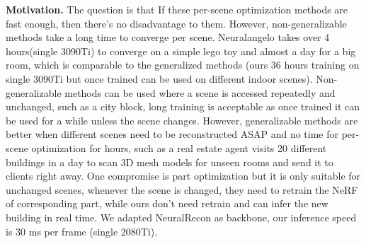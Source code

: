 \noindent
\textbf{Motivation.} The question is that If these per-scene optimization methods are fast enough, then there's no disadvantage to them. However, non-generalizable methods take a long time to converge per scene. Neuralangelo\cite{neuralangelo} takes over 4 hours(single 3090Ti) to converge on a simple lego toy and almost a day for a big room, which is comparable to the generalized methods (ours 36 hours training on single 3090Ti but once trained can be used on different indoor scenes). Non-generalizable methods can be used where a scene is accessed repeatedly and unchanged, such as a city block, long training is acceptable as once trained it can be used for a while unless the scene changes. However, generalizable methods are better when different scenes need to be reconstructed ASAP and no time for per-scene optimization for hours, such as a real estate agent visits 20 different buildings in a day to scan 3D mesh models for unseen rooms and send it to clients right away. One compromise is part optimization but it is only suitable for unchanged scenes, whenever the scene is changed, they need to retrain the NeRF of corresponding part, while ours don’t need retrain and can infer the new building in real time. We adapted NeuralRecon as backbone, our inference speed is 30 ms per frame (single 2080Ti).




